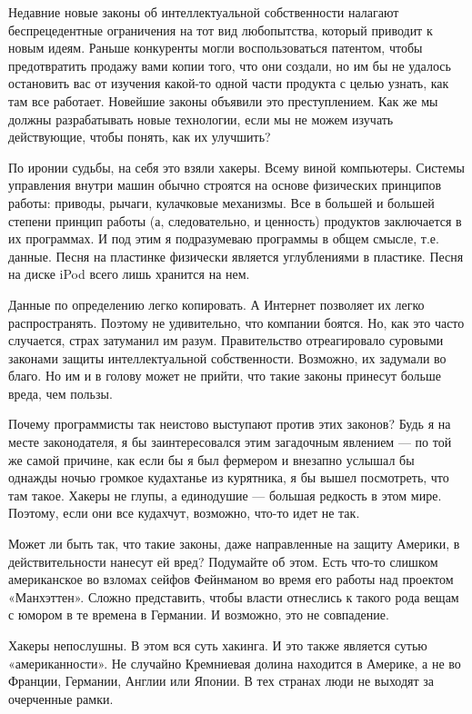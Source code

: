 \documentclass[ebook,12pt,oneside,openany]{memoir}
\begin{document}
Недавние новые законы об интеллектуальной собственности налагают
беспрецедентные ограничения на тот вид любопытства, который приводит к
новым идеям. Раньше конкуренты могли воспользоваться патентом, чтобы
предотвратить продажу вами копии того, что они создали, но им бы не
удалось остановить вас от изучения какой-то одной части продукта с
целью узнать, как там все работает. Новейшие законы объявили это
преступлением. Как же мы должны разрабатывать новые технологии, если
мы не можем изучать действующие, чтобы понять, как их улучшить?

По иронии судьбы, на себя это взяли хакеры. Всему виной компьютеры.
Системы управления внутри машин обычно строятся на основе физических
принципов работы: приводы, рычаги, кулачковые механизмы. Все в большей
и большей степени принцип работы (а, следовательно, и ценность)
продуктов заключается в их программах. И под этим я подразумеваю
программы в общем смысле, т.е. данные. Песня на пластинке физически
является углублениями в пластике. Песня на диске iPod всего лишь
хранится на нем.

Данные по определению легко копировать. А Интернет позволяет их легко
распространять. Поэтому не удивительно, что компании боятся. Но, как
это часто случается, страх затуманил им разум. Правительство
отреагировало суровыми законами защиты интеллектуальной собственности.
Возможно, их задумали во благо. Но им и в голову может не прийти, что
такие законы принесут больше вреда, чем пользы.

Почему программисты так неистово выступают против этих законов? Будь я
на месте законодателя, я бы заинтересовался этим загадочным явлением —
по той же самой причине, как если бы я был фермером и внезапно услышал
бы однажды ночью громкое кудахтанье из курятника, я бы вышел
посмотреть, что там такое. Хакеры не глупы, а единодушие — большая
редкость в этом мире. Поэтому, если они все кудахчут, возможно, что-то
идет не так.

Может ли быть так, что такие законы, даже направленные на защиту
Америки, в действительности нанесут ей вред? Подумайте об этом. Есть
что-то слишком американское во взломах сейфов Фейнманом во время его
работы над проектом «Манхэттен». Сложно представить, чтобы власти
отнеслись к такого рода вещам с юмором в те времена в Германии. И
возможно, это не совпадение.

Хакеры непослушны. В этом вся суть хакинга. И это также является сутью
«американности». Не случайно Кремниевая долина находится в Америке, а
не во Франции, Германии, Англии или Японии. В тех странах люди не
выходят за очерченные рамки.
\end{document}
